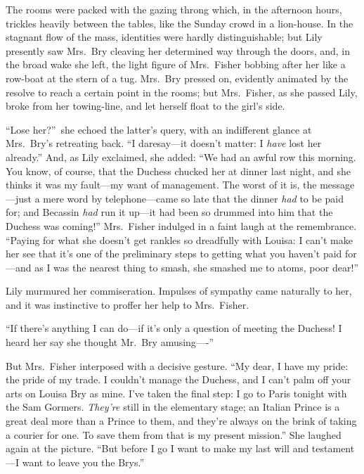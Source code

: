 \documentclass[12pt,a4paper]{book}
\begin{document}
The rooms were packed with the gazing throng which, in the
afternoon hours, trickles heavily between the tables, like the
Sunday crowd in a lion-house. In the stagnant flow of the mass,
identities were hardly distinguishable; but Lily presently saw
Mrs.\ Bry cleaving her determined way through the doors, and, in
the broad wake she left, the light figure of Mrs.\ Fisher bobbing
after her like a row-boat at the stern of a tug. Mrs.\ Bry pressed
on, evidently animated by the resolve to reach a certain point in
the rooms; but Mrs.\ Fisher, as she passed Lily, broke from her
towing-line, and let herself float to the girl's side.





``Lose her?''\ she echoed the latter's query, with an indifferent
glance at Mrs.\ Bry's retreating back. ``I daresay---it doesn't
matter: I \textit{have} lost her already.'' And, as Lily exclaimed,
she added: ``We had an awful row this morning. You know, of
course, that the Duchess chucked her at dinner last night, and
she thinks it was my fault---my want of management. The worst of
it is, the message---just a mere word by telephone---came so late
that the dinner \textit{had} to be paid for; and Becassin \textit{had} run it
up---it had been so drummed into him that the Duchess was coming!''
Mrs.\ Fisher indulged in a faint laugh at the remembrance. ``Paying
for what she doesn't get rankles so dreadfully with Louisa: I
can't make her see that it's one of the preliminary steps to
getting what you haven't paid for---and as I was the nearest thing
to smash, she smashed me to atoms, poor dear!''





Lily murmured her commiseration. Impulses of sympathy came
naturally to her, and it was instinctive to proffer her help to
Mrs.\ Fisher.





``If there's anything I can do---if it's only a question of meeting
the Duchess! I heard her say she thought Mr.\ Bry amusing----''





But Mrs.\ Fisher interposed with a decisive gesture. ``My dear, I
have my pride: the pride of my trade. I couldn't manage the
Duchess, and I can't palm off your arts on Louisa Bry as mine. 
I've taken the final step: I go to Paris tonight with the Sam
Gormers. \textit{They're} still in the elementary stage; an Italian Prince
is a great deal more than a Prince to them, and they're always on
the brink of taking a courier for one. To save them from that is
my present mission.'' She laughed again at the picture. ``But
before I go I want to make my last will and testament---I want to
leave you the Brys.''
\end{document}
